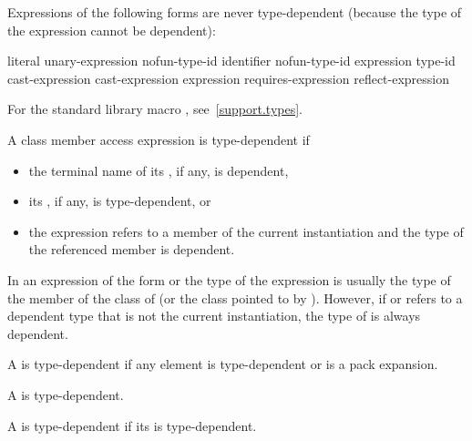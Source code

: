 \pnum
Expressions of the following forms are never type-dependent (because the type
of the expression cannot be dependent):

\begin{ncsimplebnf}
literal\br
{} unary-expression\br
{} \terminal{(} nofun-type-id \terminal{)}\br
{}  \terminal{(} identifier \terminal{)}\br
{} \terminal{(} nofun-type-id \terminal{)}\br
{} \terminal{(} expression \terminal{)}\br
{} \terminal{(} type-id \terminal{)}\br
\opt{\terminal{::}}  cast-expression\br
\opt{\terminal{::}}  \terminal{[} \terminal{]} cast-expression\br
{} \br
{} \terminal{(} expression \terminal{)}\br
requires-expression\br
reflect-expression
\end{ncsimplebnf}

\begin{note}
For the standard library macro ,
see~\ref{support.types}.
\end{note}

\pnum
A class member access expression is
type-dependent if
\begin{itemize}
\item
the terminal name of its , if any, is dependent,
\item
its , if any, is type-dependent, or
\item
the expression refers to a member of the current instantiation and
the type of the referenced member is dependent.
\end{itemize}
\begin{note}
In an expression of the form
or
the type of the expression is usually the type of the member
of the class of
(or the class pointed to by
).
However, if
or
refers to a dependent type that is not the current instantiation,
the type of
is always dependent.
\end{note}

\pnum
A  is type-dependent if any element is
type-dependent or is a pack expansion.

\pnum
A  is type-dependent.

\pnum
A  is type-dependent
if its  is type-dependent.

